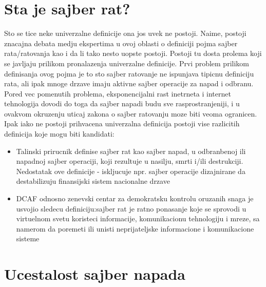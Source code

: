 \documentclass[a4paper]{article}
\begin{document}
{\section{Sta je sajber rat?}
Sto se tice neke univerzalne definicije ona jos uvek ne postoji.
Naime, postoji znacajna debata medju ekspertima u ovoj oblasti o definiciji pojma sajber rata/ratovanja kao i da li tako nesto uopste postoji. Postoji tu dosta prolema koji se javljaju prilikom pronalazenja univerzalne definicije.
Prvi problem prilikom definisanja ovog pojma je to sto sajber ratovanje ne ispunjava tipicnu definiciju rata, ali ipak mnoge drzave imaju aktivne sajber operacije za napad i odbranu. Pored vec pomenutih problema, eksponencijalni rast inetrneta i internet tehnologija dovodi do toga da sajber napadi budu sve rasprostranjeniji, i u ovakvom okruzenju uticaj zakona o sajber ratovanju moze biti veoma ogranicen.
Ipak iako ne postoji prihvacena univerzalna definicija postoji vise razlicitih definicija koje mogu biti kandidati:
\begin{itemize}
\item  Talinski prirucnik definise sajber rat kao sajber napad, u
odbranbenoj ili napadnoj sajber operaciji, koji rezultuje u
nasilju, smrti i/ili destrukciji. Nedostatak ove definicije -
iskljucuje npr. sajber operacije dizajnirane da destabilizuju
finansijski sistem nacionalne drzave
\item DCAF odnosno zenevski centar za demokratsku kontrolu oruzanih snaga je usvojio sledecu definiciju:sajber rat je ratno ponasanje koje se sprovodi u virtuelnom svetu koristeci informacije, komunikacionu tehnologiju i mreze, sa namerom da poremeti ili unisti neprijateljske informacione i komunikacione sisteme
\end{itemize} 




\section{Ucestalost sajber napada}	
\label{sec:termini_i_citiranje}

}
\end{document}
